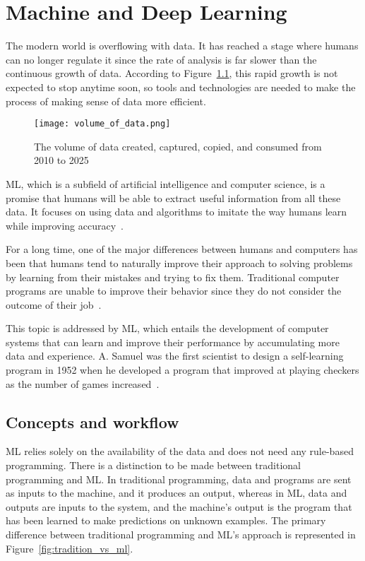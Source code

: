 \chapter{Machine and Deep Learning} \label{sec:ml}

The modern world is overflowing with data. It has reached a stage where humans can no longer regulate it since the rate of analysis is far slower than the continuous growth of data. According to Figure~\ref{fig:volume_of_data}, this rapid growth is not expected to stop anytime soon, so tools and technologies are needed to make the process of making sense of data more efficient.

\begin{figure}[htbp]
    \centering
    \texttt{[image: volume\_of\_data.png]}
    \caption{The volume of data created, captured, copied, and consumed from 2010 to 2025~\cite{TotalStatista}}
    \label{fig:volume_of_data}
\end{figure}

\gls{ML}, which is a subfield of artificial intelligence and computer science, is a promise that humans will be able to extract useful information from all these data. It focuses on using data and algorithms to imitate the way humans learn while improving accuracy~\cite{IBMCloudEducationWhatLearning}.

For a long time, one of the major differences between humans and computers has been that humans tend to naturally improve their approach to solving problems by learning from their mistakes and trying to fix them. Traditional computer programs are unable to improve their behavior since they do not consider the outcome of their job~\cite{Luckert2016UsingDocuments}. 

This topic is addressed by \gls{ML}, which entails the development of computer systems that can learn and improve their performance by accumulating more data and experience. A. Samuel was the first scientist to design a self-learning program in 1952 when he developed a program that improved at playing checkers as the number of games increased~\cite{Samuel1959SomeCheckers,Luckert2016UsingDocuments}. 

\section{Concepts and workflow}

\gls{ML} relies solely on the availability of the data and does not need any rule-based programming. There is a distinction to be made between traditional programming and \gls{ML}. In traditional programming, data and programs are sent as inputs to the machine, and it produces an output, whereas in \gls{ML}, data and outputs are inputs to the system, and the machine's output is the program that has been learned to make predictions on unknown examples. The primary difference between traditional programming and \gls{ML}'s approach is represented in Figure~\ref{fig:tradition_vs_ml}.

